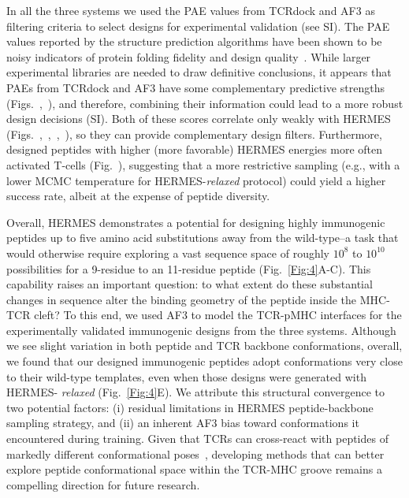 In all the three systems we used the PAE values from TCRdock and AF3 as filtering criteria to select
designs for experimental validation (see SI). The PAE values reported by the structure prediction
algorithms have been shown to be noisy indicators of protein folding fidelity and design
quality~\cite{Roney2022-am}. While larger experimental libraries are needed to draw definitive
conclusions, it appears that PAEs from TCRdock and AF3 have some complementary predictive strengths
({Figs.~\DesignTCRDockAFScatterFigure,~\DesignAUCFigure}), and therefore, combining their
information could lead to a more robust design decisions (SI). {Both of these scores correlate only
weakly
with HERMES
(Figs.~\DesignTCRDockAFScatterFigure,~\DesignTcrdockNyesoFigure,~\DesignTcrdockEbvFigure,~\DesignTcrdockMageFigure),
so they can provide complementary design filters. Furthermore, designed peptides with higher (more
favorable) HERMES energies more often activated T-cells (Fig.~\DesignAUCFigure), suggesting that a
more restrictive sampling (e.g., with a lower MCMC temperature for HERMES-{\em relaxed} protocol)
could yield a higher success rate, albeit at the expense of peptide diversity.}

Overall, HERMES demonstrates a potential for designing highly immunogenic peptides up to five amino
acid substitutions away from the wild-type--a task that would otherwise require exploring a vast
sequence space of roughly $10^8$ to $10^{10}$ possibilities for a 9-residue to an 11-residue peptide
(Fig.~\ref{Fig:4}A-C). {This capability raises an important question: to what extent do these
substantial changes in sequence alter the binding geometry of the peptide inside the MHC-TCR cleft?
To this end, we used AF3 to model the TCR-pMHC interfaces for the experimentally validated
immunogenic designs from the three systems. Although we see slight variation in both peptide and TCR
backbone conformations, overall, we found that our designed immunogenic peptides adopt conformations
very close to their wild-type templates, even when those designs were generated with HERMES-{\em
relaxed} (Fig.~\ref{Fig:4}E). We attribute this structural convergence to two potential factors: (i)
residual limitations in HERMES peptide-backbone sampling strategy, and (ii) an inherent AF3 bias
toward conformations it encountered during training. Given that TCRs can cross-react with peptides
of markedly different conformational poses~\cite{Riley2018-zi}, developing methods that can better
explore peptide conformational space within the TCR-MHC groove remains a compelling direction for
future research.}


